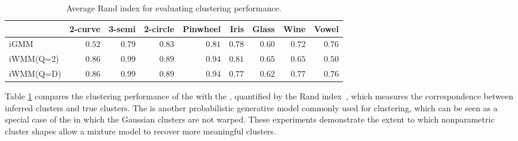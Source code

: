 \begin{table}[ht!]
\centering
\caption[Clustering performance comparison]
{Average Rand index for evaluating clustering performance.}
\label{tab:rand}
\begin{tabular}{lrrrrrrrr}
\hline
 & 2-curve & 3-semi & 2-circle & Pinwheel & Iris  & Glass  & Wine  & Vowel  \\
\hline
iGMM & $0.52$ & $0.79$ & $0.83$ & $0.81$ & $0.78$ & $0.60$ & $0.72$ & $\mathbf{0.76}$ \\
iWMM(Q=2) & $\mathbf{0.86}$ & $\mathbf{0.99}$ & $\mathbf{0.89}$ & $\mathbf{0.94}$ & $\mathbf{0.81}$ & $\mathbf{0.65}$ & $0.65$ & $0.50$ \\
iWMM(Q=D) & $\mathbf{0.86}$ & $\mathbf{0.99}$ & $\mathbf{0.89}$ & $\mathbf{0.94}$ & $0.77$ & $0.62$ & $\mathbf{0.77}$ & $\mathbf{0.76}$ \\
\hline
\end{tabular}
\end{table}
%
Table \ref{tab:rand} compares the clustering performance of the \iwmm{} with the \iGMM{}, quantified by the Rand index~\citep{rand1971objective}, which measures the correspondence between inferred clusters and true clusters.
The \iGMM{} is another probabilistic generative model commonly used for clustering, which can be seen as a special case of the \iwmm{} in which the Gaussian clusters are not warped.  
These experiments demonstrate the extent to which nonparametric cluster shapes allow a mixture model to recover more meaningful clusters.


